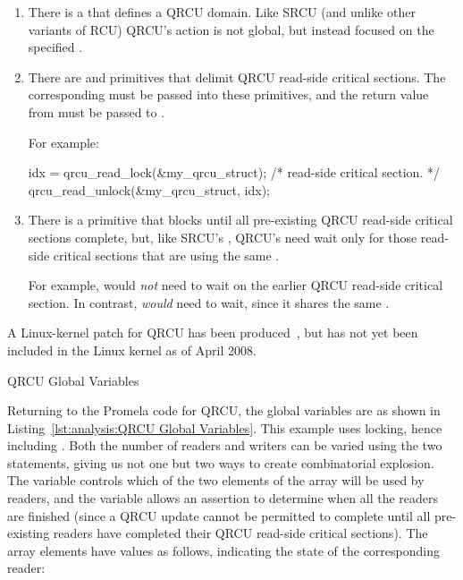 \begin{enumerate}
\item	There is a  that defines a QRCU domain.
	Like SRCU (and unlike other variants of RCU) QRCU's action
	is not global, but instead focused on the specified
	.
\item	There are  and 
	primitives that delimit QRCU read-side critical sections.
	The corresponding  must be passed into
	these primitives, and the return value from 
	must be passed to .

	For example:

\begin{VerbatimU}
idx = qrcu_read_lock(&my_qrcu_struct);
/* read-side critical section. */
qrcu_read_unlock(&my_qrcu_struct, idx);
\end{VerbatimU}

\item	There is a  primitive that blocks until
	all pre-existing QRCU read-side critical sections complete,
	but, like SRCU's , QRCU's
	 need wait only for those read-side
	critical sections that are using the same .

	For example, 
	would \emph{not} need to wait on the earlier QRCU read-side
	critical section.
	In contrast, 
	\emph{would} need to wait, since it shares the same
	.
\end{enumerate}

A Linux-kernel patch for QRCU has been
produced~\cite{PaulMcKenney2007QRCUpatch},
but has not yet been included in the Linux kernel as of
April 2008.

\begin{listing}[htbp]

\caption{QRCU Global Variables}
\label{lst:analysis:QRCU Global Variables}
\end{listing}

Returning to the Promela code for QRCU, the global variables are as shown in
Listing~\ref{lst:analysis:QRCU Global Variables}.
This example uses locking, hence including .
Both the number of readers and writers can be varied using the
two  statements, giving us not one but two ways to create
combinatorial explosion.
The  variable controls which of the two elements of the 
array will be used by readers, and the  variable
allows an assertion to determine when all the readers are finished
(since a QRCU update cannot be permitted to complete until all
pre-existing readers have completed their QRCU read-side critical
sections).
The  array elements have values as follows,
indicating the state of the corresponding reader:

